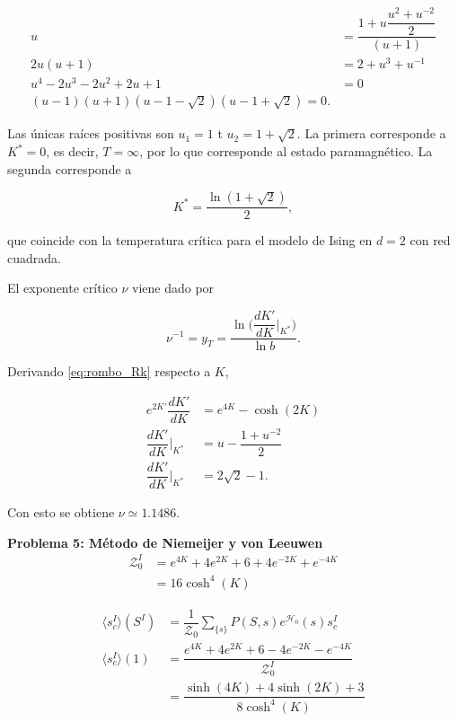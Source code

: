 \documentclass[10pt]{article}
\begin{document}
\begin{align}
u &= \dfrac{1 + u\dfrac{u^2 + u^{-2}}{2}}{(u+1)} \\
2 u (u+1) &= 2 + u^3 + u^{-1} \\
u^4 - 2 u^3 - 2u^2 + 2u + 1 &= 0 \\
(u-1)(u+1)(u-1-\sqrt{2})(u-1+\sqrt{2}) = 0.
\end{align}

Las \'unicas ra\'ices positivas son $u_1 = 1$ t $u_2 = 1+\sqrt{2}$. La primera corresponde a $K^* = 0$, es decir, $T=\infty$, por lo que corresponde al estado paramagn\'etico. La segunda corresponde a 

\begin{equation}
K^* = \dfrac{\ln(1+\sqrt{2})}{2},
\end{equation}

que coincide con la temperatura cr\'itica para el modelo de Ising en $d=2$ con red cuadrada.

El exponente cr\'itico $\nu$ viene dado por 

\begin{equation}
\nu^{-1} = y_T = \dfrac{\ln\bigg(\dfrac{dK'}{dK}\bigg\rvert_{K^*} \bigg)}{\ln b}.
\end{equation}

Derivando \ref{eq:rombo_Rk} respecto a $K$,

\begin{align}
e^{2K'} \dfrac{dK'}{dK} &= e^{4K} - \cosh(2K) \\
\dfrac{dK'}{dK}\bigg\rvert_{K^*} &= u - \dfrac{1+u^{-2}}{2}\\
\dfrac{dK'}{dK}\bigg\rvert_{K^*} &= 2\sqrt{2}-1.
\end{align}

Con esto se obtiene $\nu \simeq 1.1486$.

\pagebreak

\textbf{Problema 5: M\'etodo de Niemeijer y von Leeuwen}\\

\begin{align}
\mathcal{Z}_0^I &= e^{4K} + 4 e^{2K} + 6 + 4 e^{-2K} + e^{-4K} \nonumber \\
&= 16 \cosh^4(K)
\end{align}

\begin{align}
\langle s_c^I \rangle(S^I) &= \dfrac{1}{\mathcal{Z}_0} \sum_{\lbrace s \rbrace} P(S, s) e^{\mathcal{H}_0}(s) s_c^I \nonumber \\
\langle s_c^I \rangle(1)&= \dfrac{e^{4K} + 4 e^{2K} + 6 - 4 e^{-2K} - e^{-4K}}{\mathcal{Z}_0^I} \nonumber \\
&= \dfrac{\sinh(4K) + 4\sinh(2K) + 3}{8 \cosh^4(K)}
\end{align}
\end{document}
